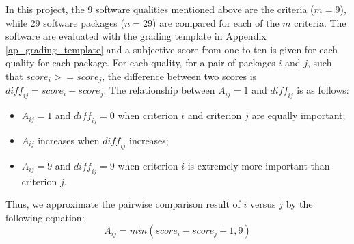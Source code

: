 In this project, the 9 software qualities mentioned above are the criteria ($m = 9$), while 29 software packages ($n = 29$) are compared for each of the $m$ criteria. The software are evaluated with the grading template in Appendix \ref{ap_grading_template} and a subjective score from one to ten is given for each quality for each package. For each quality, for a pair of packages $i$ and $j$, such that $score_i >= score_j$, the difference between two scores is $\mathit{diff_{ij}} = score_i - score_j$. The relationship between $A_{ij} = 1$ and $\mathit{diff_{ij}}$ is as follows:
\begin{itemize}
\item $A_{ij} = 1$ and $\mathit{diff_{ij}} = 0$ when criterion $i$ and criterion $j$ are equally important;
\item $A_{ij}$ increases when $\mathit{diff_{ij}}$ increases;
\item $A_{ij} = 9$ and $\mathit{diff_{ij}} = 9$ when criterion $i$ is extremely more important than criterion $j$.
\end{itemize}
Thus, we approximate the pairwise comparison result of $i$ versus $j$ by the following equation:
\begin{equation}
A_{ij} = min(score_i - score_j + 1, 9)
\end{equation}
